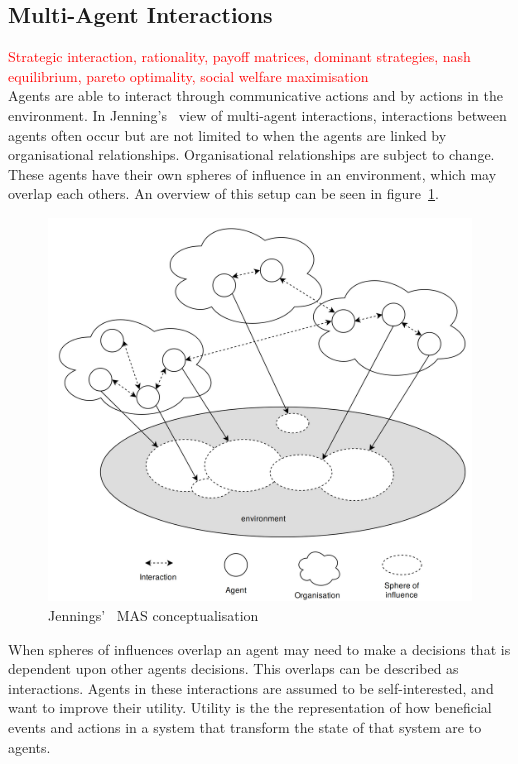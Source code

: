 \documentclass[]{final_report}
\begin{document}
\subsection{Multi-Agent Interactions}
\textcolor{red}{Strategic interaction, rationality, payoff matrices, dominant strategies, nash equilibrium, pareto optimality, social welfare maximisation}\\
Agents are able to interact through communicative actions and by actions in the environment. In Jenning's~\cite{jennings2000agent} view of multi-agent interactions, interactions between agents often occur but are not limited to when the agents are linked by organisational relationships. Organisational relationships are subject to change. These agents have their own spheres of influence in an environment, which may overlap each others. An overview of this setup can be seen in figure~\ref{fig:jenningsmas}.\par 
\begin{figure}
\vspace{-20pt}
\begin{framed}
\centering
	\includegraphics[width=\textwidth]{JenningsMAS.png}
	\caption{Jennings'~\cite{jennings2000agent} MAS conceptualisation}
	\label{fig:jenningsmas}
\end{framed}
\vspace{-30pt}
\end{figure}
When spheres of influences overlap an agent may need to make a decisions that is dependent upon other agents decisions. This overlaps can be described as interactions. Agents in these interactions are assumed to be self-interested, and want to improve their utility. Utility is the the representation of how beneficial events and actions in a system that transform the state of that system are to agents.\par 
\end{document}
